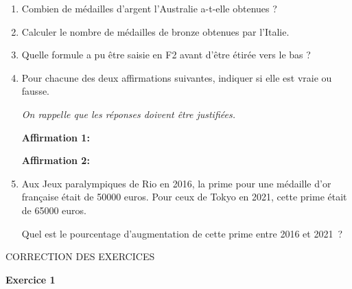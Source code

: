 \documentclass{article}
\begin{document}
\begin{enumerate}
	\item Combien de médailles d'argent l'Australie a-t-elle obtenues ?
	\item Calculer le nombre de médailles de bronze obtenues par l'Italie.
	\item Quelle formule a pu être saisie en \textsf{F2} avant d'être étirée vers le bas ?
	\item Pour chacune des deux affirmations suivantes, indiquer si elle est vraie ou fausse.

	\emph{On rappelle que les réponses doivent être justifiées.}

	\textbf{Affirmation 1:}


	\smallskip

	\textbf{Affirmation 2:}


	\item Aux Jeux paralympiques de Rio en 2016, la prime pour une médaille d'or française était de \num{50000} euros. Pour ceux de Tokyo en 2021, cette prime était de \num{65000} euros.

Quel est le pourcentage d'augmentation de cette prime entre 2016 et 2021~?

\end{enumerate}

\newpage
\begin{center}\LARGE
    CORRECTION DES EXERCICES
\end{center}

\textbf{Exercice 1}

\medskip
\end{document}
